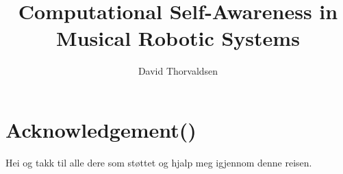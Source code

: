 \title{Computational Self-Awareness in Musical Robotic Systems} %
\author{David Thorvaldsen}
\duoforside[dept={Institute for Informatics}, program={Informatics: Robotics and Intelligent Systems}, long]

\newpage

\chapter*{Acknowledgement()} %
Hei og takk til alle dere som støttet og hjalp meg igjennom denne reisen.
\newpage

\tableofcontents
\newpage

\listoftables
\newpage

\listoffigures %
\newpage

\setcounter{page}{1}